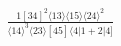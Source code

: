 \documentclass[varwidth, border=5pt]{standalone}
\begin{document}
\begin{my}
$\begin{gathered}
\scriptscriptstyle\frac{1[34]^2⟨13⟩⟨15⟩⟨24⟩^2}{⟨14⟩^3⟨23⟩[45]⟨4|1+2|4]}
\end{gathered}$
\end{my}
\end{document}
